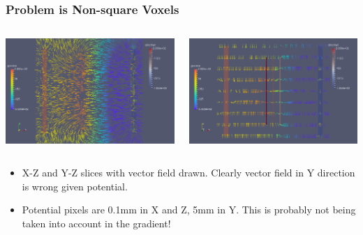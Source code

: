 \documentclass[xcolor=dvipsnames]{beamer}
\begin{document}
\begin{frame}
  \frametitle{Problem is Non-square Voxels}
  \begin{columns}
    \begin{column}{0.5\textwidth}
      \includegraphics[width=\textwidth]{twodee-fine-arrows-plan.png}      
    \end{column}
    \begin{column}{0.5\textwidth}
      \includegraphics[width=\textwidth]{twodee-fine-arrows-side.png}      
    \end{column}
  \end{columns}
  \footnotesize
  \begin{itemize}
  \item X-Z and Y-Z slices with vector field drawn.  Clearly vector
    field in Y direction is wrong given potential.
  \item Potential pixels are 0.1mm in X and Z, 5mm in Y.  This is
    probably not being taken into account in the gradient!
  \end{itemize}
\end{frame}
\end{document}
